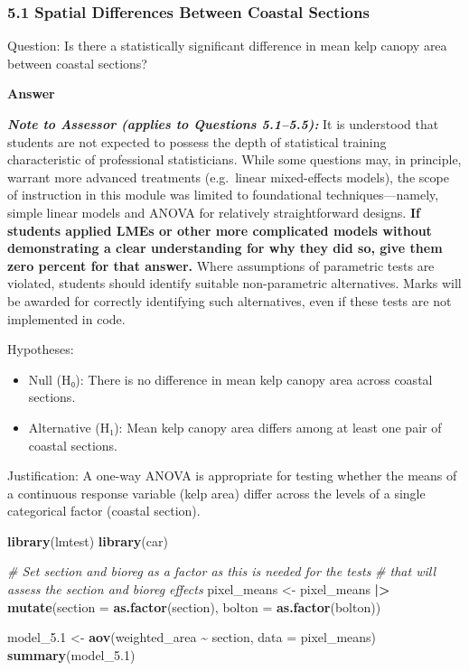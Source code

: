 \documentclass[
  british,
  10pt,
]{article}
\newenvironment{Shaded}{\begin{snugshade}}{\end{snugshade}}
\newcommand{\AttributeTok}[1]{\textcolor[rgb]{0.13,0.29,0.53}{#1}}
\newcommand{\CommentTok}[1]{\textcolor[rgb]{0.56,0.35,0.01}{\textit{#1}}}
\newcommand{\FloatTok}[1]{\textcolor[rgb]{0.00,0.00,0.81}{#1}}
\newcommand{\FunctionTok}[1]{\textcolor[rgb]{0.13,0.29,0.53}{\textbf{#1}}}
\newcommand{\NormalTok}[1]{#1}
\newcommand{\OtherTok}[1]{\textcolor[rgb]{0.56,0.35,0.01}{#1}}
\newcommand{\SpecialCharTok}[1]{\textcolor[rgb]{0.81,0.36,0.00}{\textbf{#1}}}
\providecommand{\tightlist}{%
  \setlength{\itemsep}{0pt}\setlength{\parskip}{0pt}}
\begin{document}
\subsubsection{5.1 Spatial Differences Between Coastal
Sections}\label{spatial-differences-between-coastal-sections}

Question: Is there a statistically significant difference in mean kelp
canopy area between coastal sections?

\textbf{Answer}

\textbf{\emph{Note to Assessor (applies to Questions 5.1--5.5):}} It is
understood that students are not expected to possess the depth of
statistical training characteristic of professional statisticians. While
some questions may, in principle, warrant more advanced treatments
(e.g.~linear mixed-effects models), the scope of instruction in this
module was limited to foundational techniques---namely, simple linear
models and ANOVA for relatively straightforward designs. \textbf{If
students applied LMEs or other more complicated models without
demonstrating a clear understanding for why they did so, give them zero
percent for that answer.} Where assumptions of parametric tests are
violated, students should identify suitable non-parametric alternatives.
Marks will be awarded for correctly identifying such alternatives, even
if these tests are not implemented in code.

Hypotheses:

\begin{itemize}
\tightlist
\item
  Null (H₀): There is no difference in mean kelp canopy area across
  coastal sections.
\item
  Alternative (H₁): Mean kelp canopy area differs among at least one
  pair of coastal sections.
\end{itemize}

Justification: A one-way ANOVA is appropriate for testing whether the
means of a continuous response variable (kelp area) differ across the
levels of a single categorical factor (coastal section).

\begin{Shaded}
\begin{Highlighting}[]
\FunctionTok{library}\NormalTok{(lmtest)}
\FunctionTok{library}\NormalTok{(car)}

\CommentTok{\# Set section and bioreg as a factor as this is needed for the tests}
\CommentTok{\# that will assess the section and bioreg effects}
\NormalTok{pixel\_means }\OtherTok{\textless{}{-}}\NormalTok{ pixel\_means }\SpecialCharTok{|\textgreater{}} 
  \FunctionTok{mutate}\NormalTok{(}\AttributeTok{section =} \FunctionTok{as.factor}\NormalTok{(section),}
         \AttributeTok{bolton =} \FunctionTok{as.factor}\NormalTok{(bolton))}

\NormalTok{model\_5}\FloatTok{.1} \OtherTok{\textless{}{-}} \FunctionTok{aov}\NormalTok{(weighted\_area }\SpecialCharTok{\textasciitilde{}}\NormalTok{ section, }\AttributeTok{data =}\NormalTok{ pixel\_means)}
\FunctionTok{summary}\NormalTok{(model\_5}\FloatTok{.1}\NormalTok{)}
\end{Highlighting}
\end{Shaded}
\end{document}
